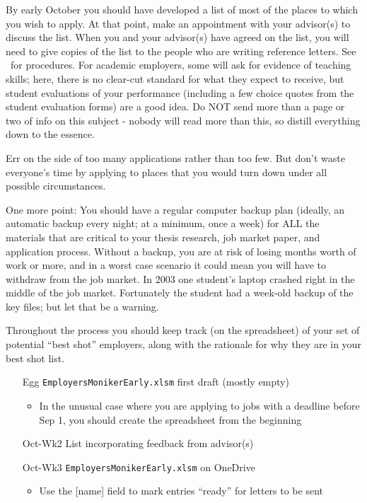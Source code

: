 \documentclass{\classes/econtex}
\begin{document}
By early October you should have developed a list of most of the places to which you wish to apply.  At that point, make an appointment with your advisor(s) to discuss the list.  When you and your advisor(s) have agreed on the list, you will need to give copies of the list to the people who are writing reference letters.  See \recLet~for procedures. For academic employers, some will ask for evidence of teaching skills; here, there is no clear-cut standard for what they expect to receive, but student evaluations of your performance (including a few choice quotes from the student evaluation forms) are a good idea.  Do NOT send more than a page or two of info on this subject - nobody will read more than this, so distill everything down to the essence.

Err on the side of too many applications rather than too few.  But
don't waste everyone's time by applying to places that you would turn
down under all possible circumstances.

One more point: You should have a regular computer backup plan
(ideally, an automatic backup every night; at a minimum, once a week)
for ALL the materials that are critical to your thesis research,
job market paper, and application process.  Without a backup, you are
at risk of losing months worth of work or more, and in a worst case
scenario it could mean you will have to withdraw from the job market.
In 2003 one student's laptop crashed right in the middle of the job
market.  Fortunately the student had a week-old backup of the key
files; but let that be a warning.

\hypertarget{best-shot}{}
Throughout the process you should keep track (on the spreadsheet) of your set of potential ``best shot'' employers, along with the rationale for why they are in your best shot list.

\begin{enumerate}
\item[Egg] \texttt{EmployersMonikerEarly.xlsm} first draft (mostly empty)
  \begin{itemize}
  \item In the unusual case where you are applying to jobs with a deadline before Sep 1, you should create the spreadsheet from the beginning
  \end{itemize}
\item[Oct-Wk2] List incorporating feedback from advisor(s)
\item[Oct-Wk3] \texttt{EmployersMonikerEarly.xlsm} on OneDrive
  \begin{itemize}
  \item Use the [name] field to mark entries ``ready'' for letters to be sent
  \end{itemize} 
\end{enumerate}
\end{document}
